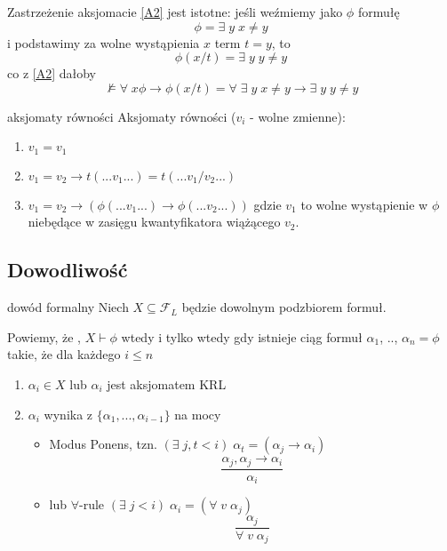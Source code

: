 Zastrzeżenie aksjomacie \ref{A2} jest istotne: jeśli weźmiemy jako $\phi$ formułę 
$$\phi = \exists\;y\;x\neq y$$ 
i podstawimy za wolne wystąpienia $x$ term $t=y$, to 
$$\phi(x/t)=\exists\;y\;y\neq y$$ 
co z \ref{A2} dałoby
$$\not\models\forall\;x\phi\to\phi(x/t)=\forall\;\exists\;y\;x\neq y\to \exists\;y\;y\neq y$$

\begin{definition}{aksjomaty równości}{}
{Aksjomaty równości} ($v_i$ - wolne zmienne):
\begin{enumerate}[label=\textbf{\color{orange}(R\arabic*)},ref=\color{orange!60!black}R\arabic*]
  \item\label{R1} $v_1=v_1$
  \item\label{R2} $v_1=v_2\to t(...v_1...)=t(...v_1/v_2...)$ 
  \item\label{R3} $v_1=v_2\to (\phi(...v_1...)\to \phi(...v_2...))$ gdzie $v_1$ to wolne wystąpienie w $\phi$ niebędące w zasięgu kwantyfikatora wiążącego $v_2$.
\end{enumerate}
\end{definition}

\subsection{Dowodliwość}

\begin{definition}{dowód formalny}{}
  Niech $X\subseteq\mathcal{F}_L$ będzie dowolnym podzbiorem formuł. 

  Powiemy, że , 
  $X\vdash \phi$ wtedy i tylko wtedy gdy istnieje ciąg formuł  $\alpha_1$, .., $\alpha_n=\phi$ takie, że dla każdego $i\leq n$
  \begin{enumerate}
    \item $\alpha_i\in X$ lub $\alpha_i$ jest aksjomatem KRL
    \item $\alpha_i$ wynika z $\{\alpha_1,...,\alpha_{i-1}\}$ na mocy 
      \begin{itemize}
        \item Modus Ponens, tzn. $(\exists\;j,t<i)\;\alpha_t=(\alpha_j\to \alpha_i)$
          $$\frac{\alpha_j,\alpha_j\to\alpha_i}{\alpha_i}$$
        \item lub $\forall$-rule $(\exists\;j<i)\;\alpha_i=(\forall\;v\;\alpha_j)$
          $$\frac{\alpha_j}{\forall\;v\;\alpha_j}$$
      \end{itemize}
  \end{enumerate}
\end{definition}

